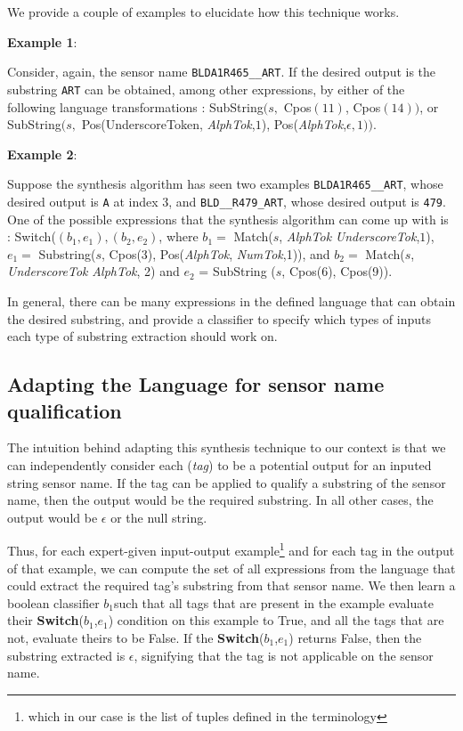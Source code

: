 We provide a couple of examples to elucidate how this technique works. 

{\bf Example 1}:

Consider, again, the sensor name \texttt{BLDA1R465\_\_ART}. If the desired output is the substring \texttt{ART} can be obtained, among other expressions, by either of the following language transformations :  SubString$(s, $ Cpos$(11)$, Cpos$(14))$, or SubString$(s,$ Pos(UnderscoreToken, {\it AlphTok},$1$), Pos({\it AlphTok},$\epsilon, 1))$.

{\bf Example 2}: 

Suppose the synthesis algorithm has seen two examples \texttt{BLDA1R465\_\_ART}, whose desired output is \texttt{A} at index 3,  and \texttt{BLD\_\_R479\_ART}, whose desired output is \texttt{479}. One of the possible expressions that the synthesis algorithm can come up with is : Switch($(b_1, e_1), (b_2,e_2)$, where $b_1 =$ Match($s$, {\it AlphTok} {\it UnderscoreTok},$1$), $e_1=$ Substring($s$, Cpos(3), Pos({\it AlphTok}, {\it NumTok},1)), and $b_2=$ Match($s$, {\it UnderscoreTok} {\it AlphTok}, 2) and $e_2$ = SubString ($s$, Cpos(6), Cpos(9)).

In general, there can be many expressions in the defined language that can obtain the desired substring, and provide a classifier to specify which types of inputs each type of substring extraction should work on.

%
%
%

\subsection{Adapting the Language for sensor name qualification}
\label{sec:adapt}

The intuition behind adapting this synthesis technique to our context is that we can independently consider each ({\it tag}) to be a potential output for an inputed string sensor name. If the tag can be applied to qualify a substring of the sensor name, then the output would be the required substring. In all other cases, the output would be $\epsilon$ or the null  string. 

Thus, for each expert-given input-output example\footnote{which in our case is the list of tuples defined in the terminology} and for each tag in the output of that example, we can compute the set of all expressions from the language that could extract the required tag's substring from that sensor name. We then learn a boolean classifier $b_1$such that all tags that are present in the example evaluate their {\bf Switch}($b_1$,$e_1$) condition on this example to True, and all the tags that are not, evaluate theirs to be False. If the {\bf Switch}($b_1$,$e_1$) returns False, then the substring extracted is $\epsilon$, signifying that the tag is not applicable on the sensor name.

